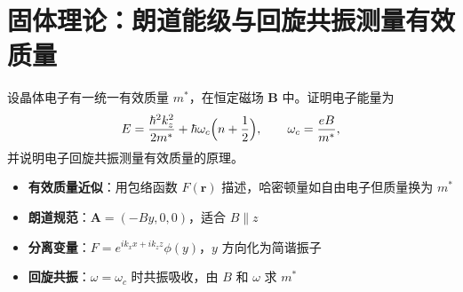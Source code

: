 \section{固体理论：朗道能级与回旋共振测量有效质量}
\label{sec:landau-levels}

\begin{modelbox}[题目：均匀磁场中晶体电子的朗道能级与回旋共振原理]
设晶体电子有一统一有效质量 $m^*$，在恒定磁场 $\bm{B}$ 中。证明电子能量为
\[
E=\frac{\hbar^2k_z^2}{2m^*}+\hbar\omega_c\Bigl(n+\frac12\Bigr),\qquad \omega_c=\frac{eB}{m^*},
\]
并说明电子回旋共振测量有效质量的原理。
\end{modelbox}

\begin{tipbox}[考点快速分析]
\begin{itemize}
    \item \textbf{有效质量近似}：用包络函数 $F(\bm{r})$ 描述，哈密顿量如自由电子但质量换为 $m^*$
    \item \textbf{朗道规范}：$\bm{A}=(-By,0,0)$，适合 $B\parallel z$
    \item \textbf{分离变量}：$F=e^{ik_xx+ik_zz}\phi(y)$，$y$ 方向化为简谐振子
    \item \textbf{回旋共振}：$\omega=\omega_c$ 时共振吸收，由 $B$ 和 $\omega$ 求 $m^*$
\end{itemize}
\end{tipbox}

